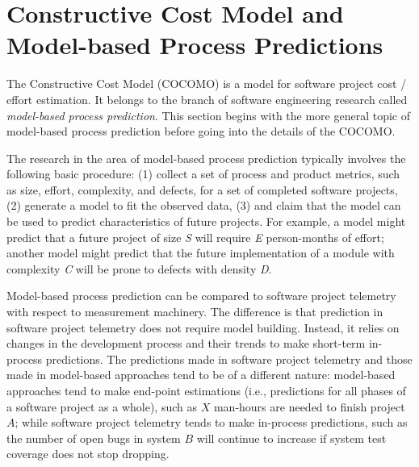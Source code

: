 \section{Constructive Cost Model and Model-based Process Predictions} \label{RelatedWork:COCOMO}

The Constructive Cost Model (COCOMO) \cite{Cocomo:1981, Cocomo:2000} is a model for software project cost / effort estimation. It belongs to the branch of software engineering research called \textit{model-based process prediction}. This section begins with the more general topic of model-based process prediction before going into the details of the COCOMO.

The research in the area of model-based process prediction typically involves the following basic procedure: (1) collect a set of process and product metrics, such as size, effort, complexity, and defects, for a set of completed software projects, (2) generate a model to fit the observed data, (3) and claim that the model can be used to predict characteristics of future projects. For example, a model might predict that a future project of size \textit{S} will require \textit{E} person-months of effort; another model might predict that the future implementation of a module with complexity \textit{C} will be prone to defects with density \textit{D}. 

Model-based process prediction can be compared to software project telemetry with respect to measurement machinery. The difference is that prediction in software project telemetry does not require model building. Instead, it relies on changes in the development process and their trends to make short-term in-process predictions. The predictions made in software project telemetry and those made in model-based approaches tend to be of a different nature: model-based approaches tend to make end-point estimations (i.e., predictions for all phases of a software project as a whole), such as $X$ man-hours are needed to finish project $A$; while software project telemetry tends to make in-process predictions, such as the number of open bugs in system $B$ will continue to increase if system test coverage does not stop dropping.

